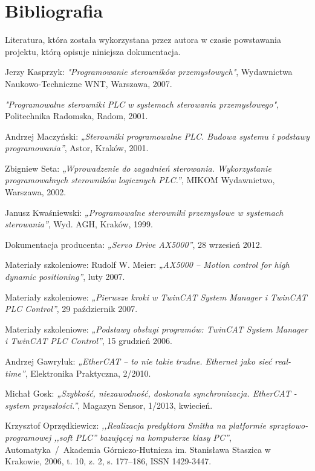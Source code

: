 \section{Bibliografia}
Literatura, która została wykorzystana przez autora w czasie powstawania projektu, którą opisuje niniejsza dokumentacja.

\begin{thebibliography}{99}
Jerzy Kasprzyk: 
\emph{"Programowanie sterowników przemysłowych"},
Wydawnictwa Naukowo-Techniczne WNT, 
Warszawa, 
2007.      

\emph{"Programowalne sterowniki PLC w systemach sterowania przemysłowego"}, 
Politechnika Radomska, 
Radom,
2001.

Andrzej Maczyński:
\emph{„Sterowniki programowalne PLC. Budowa systemu i podstawy programowania”},
Astor, 
Kraków,
2001. 

Zbigniew Seta: 
\emph{„Wprowadzenie do zagadnień sterowania. Wykorzystanie programowalnych sterowników logicznych PLC.”},
MIKOM Wydawnictwo, 
Warszawa,
2002. 

Janusz Kwaśniewski: 
\emph{„Programowalne sterowniki przemysłowe w systemach sterowania”}, 
Wyd. AGH, 
Kraków,
1999.

Dokumentacja producenta: 
\emph{„Servo Drive AX5000”}, 
28 wrzesień 2012.

Materiały szkoleniowe: Rudolf W. Meier:
\emph{„AX5000 – Motion control for high dynamic positioning”},
luty 2007.

Materiały szkoleniowe:
\emph{„Pierwsze kroki w TwinCAT System Manager i TwinCAT PLC Control”},
29 październik 2007.

Materiały szkoleniowe:
\emph{„Podstawy obsługi programów: TwinCAT System Manager i TwinCAT PLC Control”},
15 grudzień 2006.

Andrzej Gawryluk:
\emph{„EtherCAT – to nie takie trudne. Ethernet jako sieć real-time”},
Elektronika Praktyczna, 2/2010.

Michał Gosk:
\emph{„Szybkość, niezawodność, doskonała synchronizacja. EtherCAT - system przyszłości.”},
Magazyn Sensor, 1/2013, kwiecień.

Krzysztof Oprzędkiewicz:
\emph{,,Realizacja predyktora Smitha na platformie sprzętowo-programowej ,,soft PLC'' bazującej na komputerze klasy PC''},
Automatyka~/~Akademia Górniczo-Hutnicza im. Stanisława Staszica w Krakowie,
2006,
t. 10, z. 2, s. 177--186,
ISSN 1429-3447.
\end{thebibliography}


